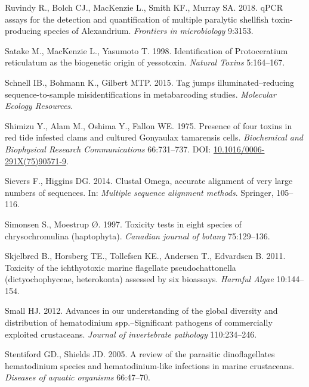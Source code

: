\documentclass[
]{article}
\begin{document}
\leavevmode\hypertarget{ref-ruvindy2018qpcr}{}%
Ruvindy R., Bolch CJ., MacKenzie L., Smith KF., Murray SA. 2018. qPCR
assays for the detection and quantification of multiple paralytic
shellfish toxin-producing species of Alexandrium. \emph{Frontiers in
microbiology} 9:3153.

\leavevmode\hypertarget{ref-Satake1998}{}%
Satake M., MacKenzie L., Yasumoto T. 1998. Identification of
Protoceratium reticulatum as the biogenetic origin of yessotoxin.
\emph{Natural Toxins} 5:164--167.

\leavevmode\hypertarget{ref-schnell2015tag}{}%
Schnell IB., Bohmann K., Gilbert MTP. 2015. Tag jumps
illuminated--reducing sequence-to-sample misidentifications in
metabarcoding studies. \emph{Molecular Ecology Resources}.

\leavevmode\hypertarget{ref-Shimizu1975}{}%
Shimizu Y., Alam M., Oshima Y., Fallon WE. 1975. Presence of four toxins
in red tide infested clams and cultured Gonyaulax tamarensis cells.
\emph{Biochemical and Biophysical Research Communications} 66:731--737.
DOI:
\href{https://doi.org/10.1016/0006-291X(75)90571-9}{10.1016/0006-291X(75)90571-9}.

\leavevmode\hypertarget{ref-sievers2014clustal}{}%
Sievers F., Higgins DG. 2014. Clustal Omega, accurate alignment of very
large numbers of sequences. In: \emph{Multiple sequence alignment
methods}. Springer, 105--116.

\leavevmode\hypertarget{ref-simonsen1997toxicity}{}%
Simonsen S., Moestrup Ø. 1997. Toxicity tests in eight species of
chrysochromulina (haptophyta). \emph{Canadian journal of botany}
75:129--136.

\leavevmode\hypertarget{ref-skjelbred2011toxicity}{}%
Skjelbred B., Horsberg TE., Tollefsen KE., Andersen T., Edvardsen B.
2011. Toxicity of the ichthyotoxic marine flagellate pseudochattonella
(dictyochophyceae, heterokonta) assessed by six bioassays. \emph{Harmful
Algae} 10:144--154.

\leavevmode\hypertarget{ref-small2012advances}{}%
Small HJ. 2012. Advances in our understanding of the global diversity
and distribution of hematodinium spp.--Significant pathogens of
commercially exploited crustaceans. \emph{Journal of invertebrate
pathology} 110:234--246.

\leavevmode\hypertarget{ref-stentiford2005review}{}%
Stentiford GD., Shields JD. 2005. A review of the parasitic
dinoflagellates hematodinium species and hematodinium-like infections in
marine crustaceans. \emph{Diseases of aquatic organisms} 66:47--70.
\end{document}
